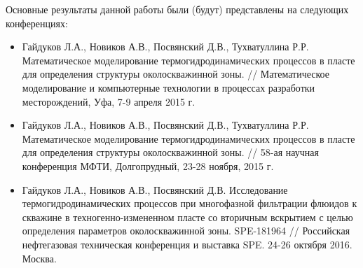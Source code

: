 	Основные результаты данной работы были (будут) представлены на следующих конференциях:
\begin{itemize}
	\item{Гайдуков Л.А., Новиков А.В., Посвянский Д.В., Тухватуллина Р.Р. Математическое моделирование термогидродинамических процессов в пласте для определения структуры околоскважинной зоны. // Математическое моделирование и компьютерные технологии в процессах разработки месторождений, Уфа,  7-9 апреля 2015 г.}
	\item{Гайдуков Л.А., Новиков А.В., Посвянский Д.В., Тухватуллина Р.Р. Математическое моделирование термогидродинамических процессов в пласте для определения структуры околоскважинной зоны. // 58-ая научная конференция МФТИ, Долгопрудный,  23-28 ноября,  2015 г.}
	\item{Гайдуков Л.А., Новиков А.В., Посвянский Д.В. Исследование термогидродинамических процессов при многофазной фильтрации флюидов к скважине в техногенно-измененном пласте со вторичным вскрытием с целью определения параметров околоскважинной зоны. SPE-181964 // Российская нефтегазовая техническая конференция и выставка SPE. 24-26 октября 2016. Москва.}
\end{itemize}